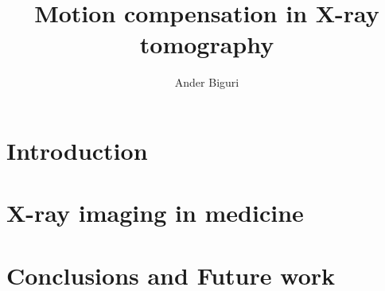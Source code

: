 \documentclass[11pt]{report}
\title{Motion compensation in X-ray tomography}
\author{Ander Biguri}
\begin{document}
\maketitle



\tableofcontents

\chapter{Introduction}\label{ch:intro}
\chapter{X-ray imaging in medicine}\label{ch:soa}
\label{ch:rec}


\label{ch:GPU}
\label{ch:apllications}

\label{ch:motion}
\label{ch:motion analisis}
\chapter{Conclusions and Future work}\label{ch:conclusions}



\end{document}
